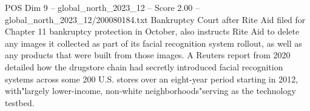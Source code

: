 \begin{textsample}{POS Dim 9 – global\_north\_2023\_12 – Score 2.00 – global\_north\_2023\_12/200080184.txt}
Bankruptcy Court after Rite Aid filed for Chapter 11 bankruptcy protection in October, also instructs Rite Aid to delete any images it collected as part of its facial recognition system rollout, as well as any products that were built from those images.
A Reuters report from 2020 detailed how the drugstore chain had secretly introduced facial recognition systems across some 200 U.S. stores over an eight-year period starting in 2012, with"largely lower-income, non-white neighborhoods"serving as the technology testbed.

\end{textsample}
